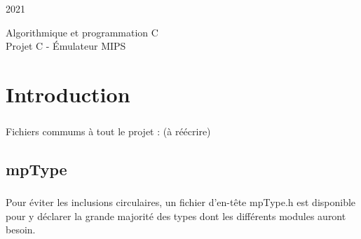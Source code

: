 \documentclass[12pt]{report} %
\begin{document}

\hfill {\large 2021} \\

\vspace{5cm}
\begin{center}
    {\Huge Algorithmique et programmation C} \\
        \vspace{1cm}
    {\huge Projet C - Émulateur MIPS}
\end{center}

\newpage


\tableofcontents
\begingroup
    \let\cleardoublepage\relax  %
    \let\clearpage\relax        %
\endgroup

\newpage

\chapter{Introduction}

\paragraph{}
Fichiers commums à tout le projet : {\tiny (à réécrire)}

\section{mpType}

\paragraph{}
Pour éviter les inclusions circulaires, un fichier d'en-tête {\ttfamily mpType.h} est disponible pour y déclarer la grande majorité des types dont les différents modules auront besoin.
\end{document}
